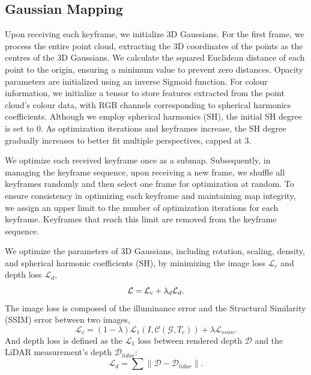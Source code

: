 \documentclass[lettersize,journal]{IEEEtran}
\begin{document}
\clearpage %



\subsection{Gaussian Mapping}
Upon receiving each keyframe, we initialize 3D Gaussians. For the first frame, we process the entire point cloud, extracting the 3D coordinates of the points as the centres of the 3D Gaussians. We calculate the squared Euclidean distance of each point to the origin, ensuring a minimum value to prevent zero distances. Opacity parameters are initialized using an inverse Sigmoid function. For colour information, we initialize a tensor to store features extracted from the point cloud's colour data, with RGB channels corresponding to spherical harmonics coefficients. Although we employ spherical harmonics (SH), the initial SH degree is set to 0. As optimization iterations and keyframes increase, the SH degree gradually increases to better fit multiple perspectives, capped at 3.

We optimize each received keyframe once as a submap. Subsequently, in managing the keyframe sequence, upon receiving a new frame, we shuffle all keyframes randomly and then select one frame for optimization at random. To ensure consistency in optimizing each keyframe and maintaining map integrity, we assign an upper limit to the number of optimization iterations for each keyframe. Keyframes that reach this limit are removed from the keyframe sequence.

We optimize the parameters of 3D Gaussians, including rotation, scaling, density, and spherical harmonic coefficients (SH), by minimizing the image loss $\mathcal{L}_c$ and depth loss $\mathcal{L}_d$,
\begin{equation}
\mathcal{L}={\mathcal{L}_c} + {{\lambda}_d}{\mathcal{L}_d}.
\label{eq:mathcal{L}}
\end{equation}
The image loss is composed of the illuminance error and the Structural Similarity (SSIM) error between two images,
\begin{equation}
\mathcal{L}_c=(1-\lambda){\mathcal{L}_1}(I,\mathcal{C}(\mathcal{G},{T_c})) + \lambda{\mathcal{L}_{ssim}}.
\label{eq:mathcalLc}
\end{equation}
And depth loss is defined as the $\mathcal{L}_1$ loss between rendered depth $\mathcal{D}$ and the LiDAR measurement’s depth $\mathcal{D}_{lidar}$:
\begin{equation}
\mathcal{L}_d = \sum \left\lVert \mathcal{D} - \mathcal{D}_{lidar} \right\rVert .
\label{eq:mathcalLd}
\end{equation}
\end{document}
